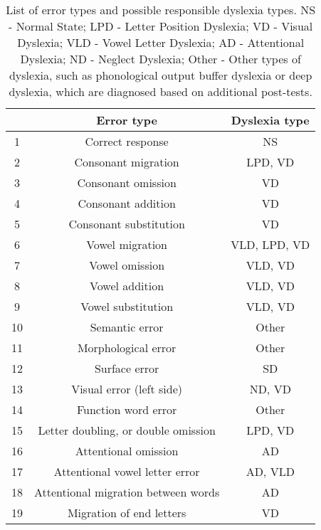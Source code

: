 \begin{table}

\caption{List of error types and possible responsible dyslexia types. NS - Normal State; LPD - Letter Position Dyslexia; VD - Visual Dyslexia; VLD - Vowel Letter Dyslexia; AD - Attentional Dyslexia; ND - Neglect Dyslexia; Other - Other types of dyslexia, such as phonological output buffer dyslexia or deep dyslexia, which are diagnosed based on additional post-tests.}

\centering
\begin{tabular}{|c|c|c|} \hline

& Error type & Dyslexia type\\
\hline
1 & Correct response & NS\\
2 & Consonant migration & LPD, VD\\
3 & Consonant omission & VD\\
4 & Consonant addition & VD\\
5 & Consonant substitution & VD\\
6 & Vowel migration & VLD, LPD, VD\\
7 & Vowel omission & VLD, VD\\
8 & Vowel addition & VLD, VD\\
9 & Vowel substitution & VLD, VD\\
10 & Semantic error & Other\\
11 & Morphological error & Other\\
12 & Surface error & SD\\
13 & Visual error (left side) & ND, VD\\
14 & Function word error & Other\\
15 & Letter doubling, or double omission & LPD, VD\\
16 & Attentional omission & AD\\
17 & Attentional vowel letter error & AD, VLD\\
18 & Attentional migration between words & AD\\
19 & Migration of end letters & VD\\

\hline\end{tabular}

\bigskip
\end{table}